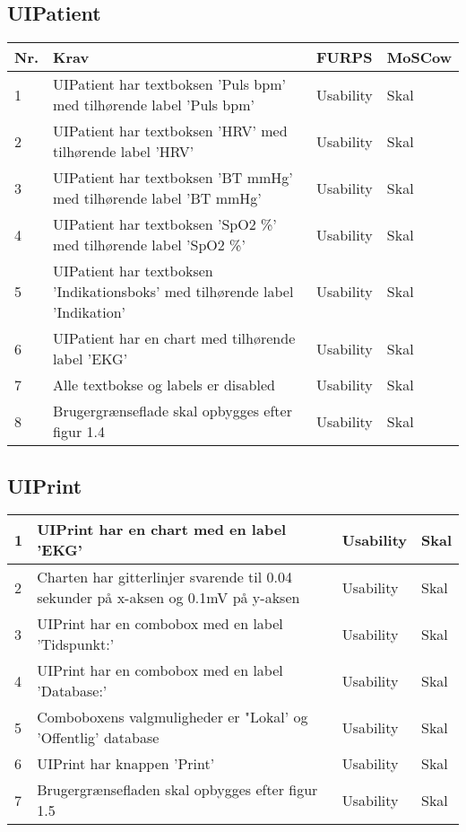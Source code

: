 \subsection{UIPatient}
\begin{table}[H]
\begin{tabular}{|p{0.5cm}|p{6cm}|p{3cm}|p{3cm}|}
\hline
\textbf{Nr.} & \textbf{Krav} & \textbf{FURPS}& \textbf{MoSCow} \\\hline
1 & UIPatient har textboksen  'Puls bpm' med tilhørende label 'Puls bpm' & Usability & Skal \\\hline
2 & UIPatient har textboksen  'HRV' med tilhørende label 'HRV' & Usability & Skal \\\hline
3 & UIPatient har textboksen  'BT mmHg' med tilhørende label 'BT mmHg' & Usability & Skal \\\hline
4 & UIPatient har textboksen  'SpO2 \%' med tilhørende label 'SpO2 \%' & Usability & Skal \\\hline
5 & UIPatient har textboksen  'Indikationsboks' med tilhørende label 'Indikation'& Usability & Skal \\\hline
6 & UIPatient har en chart med tilhørende label 'EKG' & Usability & Skal \\\hline
7 & Alle textbokse og labels er disabled & Usability & Skal \\\hline
8 & Brugergrænseflade skal opbygges efter figur 1.4 & Usability & Skal \\\hline
\end{tabular}
\end{table}

\subsection{UIPrint}
\begin{table}[H]
\begin{tabular}{|p{0.5cm}|p{6cm}|p{3cm}|p{3cm}|}
\hline
1 & UIPrint har en chart med en label 'EKG' & Usability & Skal \\\hline
2 & Charten har gitterlinjer svarende til 0.04 sekunder på x-aksen og 0.1mV på y-aksen & Usability & Skal \\\hline
3 & UIPrint har en combobox med en label 'Tidspunkt:' & Usability & Skal \\\hline
4 & UIPrint har en combobox med en label 'Database:' & Usability & Skal \\\hline
5 & Comboboxens valgmuligheder er "Lokal' og 'Offentlig' database & Usability & Skal \\\hline
6 & UIPrint har knappen 'Print' & Usability & Skal \\\hline
7 & Brugergrænsefladen skal opbygges efter figur 1.5 & Usability & Skal \\\hline
\end{tabular}
\end{table}

